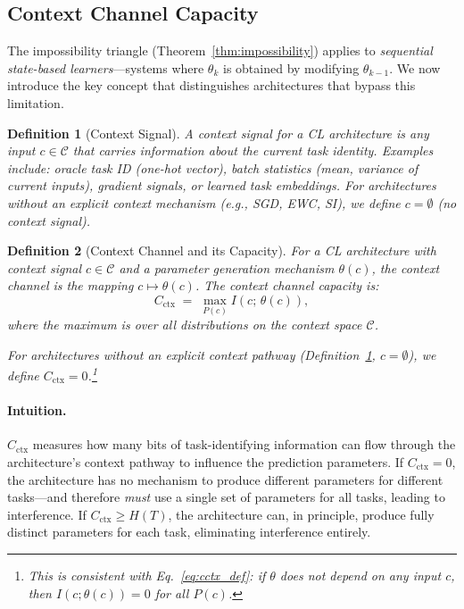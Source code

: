 \documentclass{article}
\newtheorem{definition}{Definition}
\begin{document}
\subsection{Context Channel Capacity}
\label{sec:ccc}

The impossibility triangle (Theorem~\ref{thm:impossibility}) applies to \emph{sequential state-based learners}---systems where $\theta_k$ is obtained by modifying $\theta_{k-1}$. We now introduce the key concept that distinguishes architectures that bypass this limitation.

\begin{definition}[Context Signal]
\label{def:context}
A \emph{context signal} for a CL architecture is any input $c \in \mathcal{C}$ that carries information about the current task identity. Examples include: oracle task ID (one-hot vector), batch statistics (mean, variance of current inputs), gradient signals, or learned task embeddings. For architectures without an explicit context mechanism (e.g., SGD, EWC, SI), we define $c = \emptyset$ (no context signal).
\end{definition}

\begin{definition}[Context Channel and its Capacity]
\label{def:context_channel}
For a CL architecture with context signal $c \in \mathcal{C}$ and a parameter generation mechanism $\theta(c)$, the \emph{context channel} is the mapping $c \mapsto \theta(c)$. The \emph{context channel capacity} is:
\begin{equation}
\label{eq:cctx_def}
    C_\mathrm{ctx} \;=\; \max_{P(c)} I\!\left(c;\, \theta(c)\right),
\end{equation}
where the maximum is over all distributions on the context space $\mathcal{C}$.

For architectures without an explicit context pathway (Definition~\ref{def:context}, $c = \emptyset$), we define $C_\mathrm{ctx} = 0$.\footnote{This is consistent with Eq.~\eqref{eq:cctx_def}: if $\theta$ does not depend on any input $c$, then $I(c; \theta(c)) = 0$ for all $P(c)$.}
\end{definition}

\paragraph{Intuition.} $C_\mathrm{ctx}$ measures how many bits of task-identifying information can flow through the architecture's context pathway to influence the prediction parameters. If $C_\mathrm{ctx} = 0$, the architecture has no mechanism to produce different parameters for different tasks---and therefore \emph{must} use a single set of parameters for all tasks, leading to interference. If $C_\mathrm{ctx} \geq H(T)$, the architecture can, in principle, produce fully distinct parameters for each task, eliminating interference entirely.
\end{document}
